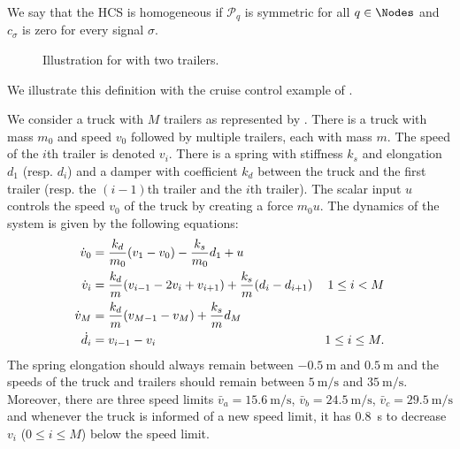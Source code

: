 \documentclass[11pt,twoside,a4paper,openright]{uclouvain-thesis}
\newcommand{\signal}{signal}
\newcommand{\Ps}{\mathcal{P}}
\newcommand{\dtahcs}{HCS}
\begin{document}
We say that the \dtahcs{} is homogeneous if $\Ps_q$ is symmetric for all $q \in \Nodes$ and $c_\sigma$ is zero for every \signal{} $\sigma$.

\begin{figure}[!h]
  \centering
  \begin{tikzpicture}
    
  \end{tikzpicture}
  \caption{Illustration for  with two trailers.}
  \label{fig:cruise}
\end{figure}

We illustrate this definition with the cruise control example of \cite{rungger2013specification}.
\begin{myexem}
  \label{exem:cruise1}
  We consider a truck with $M$ trailers as represented by .
  There is a truck with
  mass $m_0$ and
  speed $v_0$ followed by multiple trailers,
  each with mass $m$. The speed of the $i$th trailer is denoted $v_i$.
  There is a spring with stiffness $k_s$ and elongation $d_1$ (resp. $d_i$) and a damper with coefficient $k_d$
  between the truck and the first trailer (resp. the $(i-1)$th trailer and the $i$th trailer).
  The scalar input $u$ controls the speed $v_0$ of the truck
  by creating a force $m_0u$.
  The dynamics of the system is given by the following equations:
  \begin{align}
    \notag
    \dot{v}_0 & = \frac{k_d}{m_0}(v_1 - v_0) - \frac{k_s}{m_0} d_1 + u\\
    \notag
    \dot{v}_i & = \frac{k_d}{m}(v_{i-1} - 2v_i + v_{i+1}) + \frac{k_s}{m} (d_i - d_{i+1}) & 1 \leq i < M\\
    \label{eq:truckdyn}
    \dot{v}_M & = \frac{k_d}{m}(v_{M-1} - v_M) + \frac{k_s}{m} d_M\\
    \notag
    \dot{d}_i & = v_{i-1} - v_i & 1 \leq i \leq M.
  \end{align}
  The spring elongation should always remain between $-\SI{0.5}{\meter}$ and $\SI{0.5}{\meter}$ and the speeds of the truck and trailers should remain between $\SI{5}{\meter\per\second}$ and $\SI{35}{\meter\per\second}$.
  Moreover, there are three speed limits $\bar{v}_a = \SI{15.6}{\meter\per\second}$, $\bar{v}_b = \SI{24.5}{\meter\per\second}$, $\bar{v}_c = \SI{29.5}{\meter\per\second}$ and
  whenever the truck is informed of a new speed limit, it has \SI{0.8}{\second} to decrease $v_i$ ($0 \leq i \leq M$) below the speed limit.


\end{myexem}
\end{document}
